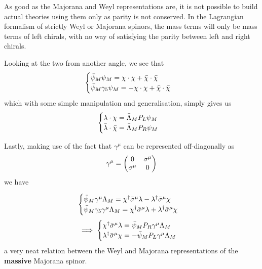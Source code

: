 As good as the Majorana and Weyl representations are, it is not possible to build actual theories using them only as parity is not conserved. In the Lagrangian formalism of strictly Weyl or Majorana spinors, the mass terms will only be mass terms of left chirals, with no way of satisfying the parity between left and right chirals.

Looking at the two from another angle, we see that
\begin{equation*}
    \begin{cases}
        \Bar{\psi}_M \psi_M = \chi\cdot\chi + \Bar{\chi}\cdot\Bar{\chi} \\
        \Bar{\psi}_M \gamma_5 \psi_M = - \chi\cdot\chi + \Bar{\chi}\cdot\Bar{\chi}
    \end{cases}
\end{equation*}
which with some simple manipulation and generalisation, simply gives us
\begin{equation*}
\begin{cases}
    \lambda\cdot\chi = \Bar{\Lambda}_M P_L\psi_M\\
    \Bar{\lambda}\cdot\Bar{\chi} = \Bar{\Lambda}_M P_R \psi_M
\end{cases}
\end{equation*}

Lastly, making use of the fact that $\gamma^\mu$ can be represented off-diagonally as
\begin{equation}
    \gamma^\mu = \begin{pmatrix} 0 & \Bar{\sigma}^\mu \\ \sigma^\mu & 0 \end{pmatrix}
\end{equation}
we have

\begin{equation*}
    \begin{cases}
        \Bar{\psi}_M \gamma^\mu \Lambda_M = \chi^\dagger \Bar{\sigma}^\mu \lambda - \lambda^\dagger \Bar{\sigma}^\mu \chi \\
        \Bar{\psi}_M \gamma_5\gamma^\mu \Lambda_M = \chi^\dagger \Bar{\sigma}^\mu \lambda + \lambda^\dagger \Bar{\sigma}^\mu \chi
    \end{cases}
\end{equation*}
\begin{equation*}
    \implies
    \begin{cases}
        \chi^\dagger \Bar{\sigma}^\mu \lambda = \Bar{\psi}_M P_R \gamma^\mu \Lambda_M\\
        \lambda^\dagger \Bar{\sigma}^\mu \chi = - \Bar{\psi}_M P_L \gamma^\mu \Lambda_M
    \end{cases}
\end{equation*}
a very neat relation between the Weyl and Majorana representations of the \textbf{massive} Majorana spinor.